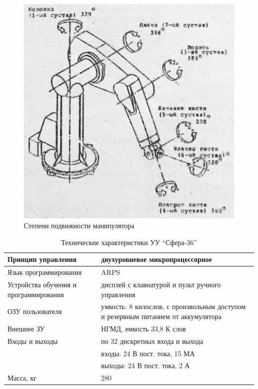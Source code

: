 \begin{figure}[ht]
\centering
    \includegraphics[scale=0.3]{Figures/1.png}
    \caption{Степени подвижности манипулятора\label{fig:moves}}
\end{figure}

\begin{longtable}[c]{|C{5cm}|C{9cm}|}
\caption{Технические характеристики УУ ``Сфера-36''\label{tab:sphere}}\\
		\hline
        Принцип управления & двухуровневое микропроцессорное\\
        \hline
        Язык программирования & ARPS\\
        \hline
        Устройства обучения и программирования & дисплей с клавиатурой и пульт ручного управления\\
        \hline
        ОЗУ пользователя & умкость: 8 килослов, с произвольным доступом и резервным питанием от аккумулятора\\
        \hline
        Внешнее ЗУ & НГМД, емкость 33,8 К слов\\
        \hline
        Входы и выходы & по 32 дискретных входа и выхода\\
        & входы: 24 В пост. тока, 15 МА\\
        & выходы: 24 В пост. тока, 2 А\\
        \hline
        Масса, кг & 280\\
        \hline
\end{longtable}

